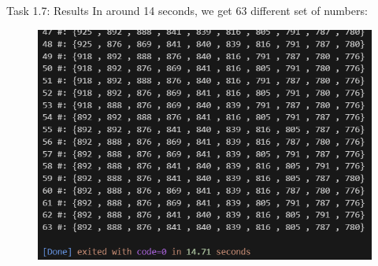 \documentclass[aspectratio=169]{beamer}
\begin{document}
\begin{frame}{Task 1.7: Results}
In around 14 seconds, we get 63 different set of numbers:
\begin{figure}
    \centering
    \includegraphics[width=0.66\linewidth]{1.7-results.PNG}
    \label{fig:enter-label}
\end{figure}
\end{frame}
\end{document}
